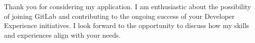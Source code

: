 \documentclass{my_cv}
\begin{document}
Thank you for considering my application. I am enthusiastic about the possibility of joining GitLab and contributing to the ongoing success of your Developer Experience initiatives. I look forward to the opportunity to discuss how my skills and experiences align with your needs.


\makeletterclosing
\end{document}
